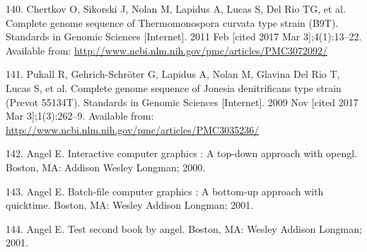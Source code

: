 \documentclass[12pt,twoside]{reedthesis}
\begin{document}
  \hypertarget{ref-chertkov_complete_2011}{}
  140. Chertkov O, Sikorski J, Nolan M, Lapidus A, Lucas S, Del Rio TG, et
  al. Complete genome sequence of Thermomonospora curvata type strain
  (B9T). Standards in Genomic Sciences {[}Internet{]}. 2011 Feb {[}cited
  2017 Mar 3{]};4(1):13--22. Available from:
  \url{http://www.ncbi.nlm.nih.gov/pmc/articles/PMC3072092/}
  
  \hypertarget{ref-pukall_complete_2009}{}
  141. Pukall R, Gehrich-Schröter G, Lapidus A, Nolan M, Glavina Del Rio
  T, Lucas S, et al. Complete genome sequence of Jonesia denitrificans
  type strain (Prevot 55134T). Standards in Genomic Sciences
  {[}Internet{]}. 2009 Nov {[}cited 2017 Mar 3{]};1(3):262--9. Available
  from: \url{http://www.ncbi.nlm.nih.gov/pmc/articles/PMC3035236/}
  
  \hypertarget{ref-angel2000}{}
  142. Angel E. Interactive computer graphics : A top-down approach with
  opengl. Boston, MA: Addison Wesley Longman; 2000.
  
  \hypertarget{ref-angel2001}{}
  143. Angel E. Batch-file computer graphics : A bottom-up approach with
  quicktime. Boston, MA: Wesley Addison Longman; 2001.
  
  \hypertarget{ref-angel2002a}{}
  144. Angel E. Test second book by angel. Boston, MA: Wesley Addison
  Longman; 2001.


\end{document}
